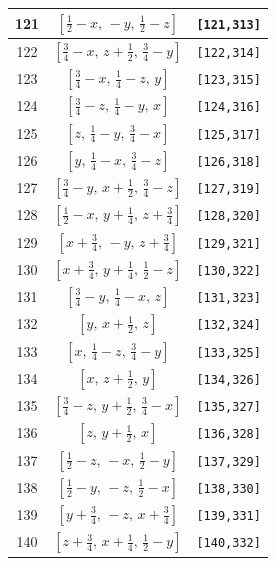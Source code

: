 \documentclass[fleqn,8pt]{jsarticle}
\begin{document}
\begin{longtable}{ccc}
121 & $\left[ \frac{1}{2} - x,\, - y,\, \frac{1}{2} - z \right]$ & {\tt [121,313]} \\ \hline
122 & $\left[ \frac{3}{4} - x,\, z + \frac{1}{2},\, \frac{3}{4} - y \right]$ & {\tt [122,314]} \\ \hline
123 & $\left[ \frac{3}{4} - x,\, \frac{1}{4} - z,\, y \right]$ & {\tt [123,315]} \\ \hline
124 & $\left[ \frac{3}{4} - z,\, \frac{1}{4} - y,\, x \right]$ & {\tt [124,316]} \\ \hline
125 & $\left[ z,\, \frac{1}{4} - y,\, \frac{3}{4} - x \right]$ & {\tt [125,317]} \\ \hline
126 & $\left[ y,\, \frac{1}{4} - x,\, \frac{3}{4} - z \right]$ & {\tt [126,318]} \\ \hline
127 & $\left[ \frac{3}{4} - y,\, x + \frac{1}{2},\, \frac{3}{4} - z \right]$ & {\tt [127,319]} \\ \hline
128 & $\left[ \frac{1}{2} - x,\, y + \frac{1}{4},\, z + \frac{3}{4} \right]$ & {\tt [128,320]} \\ \hline
129 & $\left[ x + \frac{3}{4},\, - y,\, z + \frac{3}{4} \right]$ & {\tt [129,321]} \\ \hline
130 & $\left[ x + \frac{3}{4},\, y + \frac{1}{4},\, \frac{1}{2} - z \right]$ & {\tt [130,322]} \\ \hline
131 & $\left[ \frac{3}{4} - y,\, \frac{1}{4} - x,\, z \right]$ & {\tt [131,323]} \\ \hline
132 & $\left[ y,\, x + \frac{1}{2},\, z \right]$ & {\tt [132,324]} \\ \hline
133 & $\left[ x,\, \frac{1}{4} - z,\, \frac{3}{4} - y \right]$ & {\tt [133,325]} \\ \hline
134 & $\left[ x,\, z + \frac{1}{2},\, y \right]$ & {\tt [134,326]} \\ \hline
135 & $\left[ \frac{3}{4} - z,\, y + \frac{1}{2},\, \frac{3}{4} - x \right]$ & {\tt [135,327]} \\ \hline
136 & $\left[ z,\, y + \frac{1}{2},\, x \right]$ & {\tt [136,328]} \\ \hline
137 & $\left[ \frac{1}{2} - z,\, - x,\, \frac{1}{2} - y \right]$ & {\tt [137,329]} \\ \hline
138 & $\left[ \frac{1}{2} - y,\, - z,\, \frac{1}{2} - x \right]$ & {\tt [138,330]} \\ \hline
139 & $\left[ y + \frac{3}{4},\, - z,\, x + \frac{3}{4} \right]$ & {\tt [139,331]} \\ \hline
140 & $\left[ z + \frac{3}{4},\, x + \frac{1}{4},\, \frac{1}{2} - y \right]$ & {\tt [140,332]} \\ \hline

\end{longtable}
\end{document}
